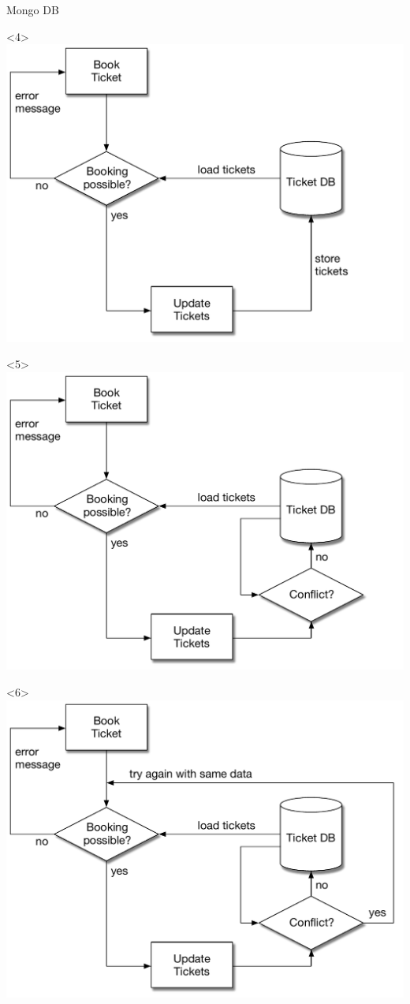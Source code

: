 \begin{frame}[fragile]{Mongo DB}
\begin{center}
\begin{onlyenv}<4>
\includegraphics[width=.85\textwidth]{../OptimisticLocking4.pdf}
\end{onlyenv}

\begin{onlyenv}<5>
\includegraphics[width=.85\textwidth]{../OptimisticLocking5.pdf}
\end{onlyenv}

\begin{onlyenv}<6>
\includegraphics[width=.85\textwidth]{../OptimisticLocking6.pdf}
\end{onlyenv}

\end{center}

\end{frame}


